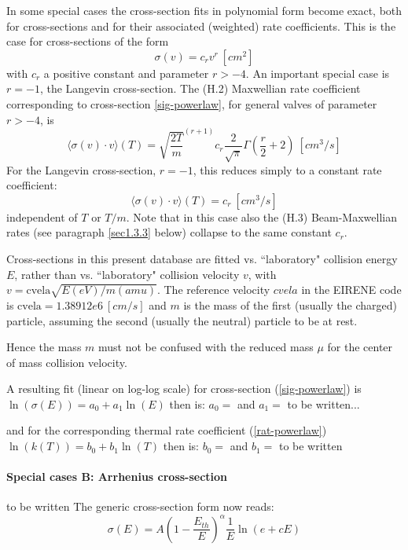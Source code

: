 \documentclass[12pt,dvipdfmx]{article}
\begin{document}
In some special cases the cross-section fits in polynomial form become exact, both for cross-sections and
for their associated (weighted) rate coefficients.
This is the case for cross-sections of the form
\begin{equation}\label{sig-powerlaw}
\sigma(v) = c_r v^r  \ [cm^2]
\end{equation}
with $c_r$ a positive constant and parameter $r>-4$. An important special case is $r=-1$, the Langevin cross-section.
The (H.2) Maxwellian rate coefficient corresponding to cross-section \ref{sig-powerlaw}, for general valves of parameter $r>-4$, is
\begin{equation}\label{rat-powerlaw}
\langle\sigma(v) \cdot v  \rangle (T) = \sqrt{\frac {2T}{m}}^{(r+1)} c_r \frac{2}{\sqrt{\pi}}
\Gamma(\frac{r}{2}+2) \ [cm^3/s]
\end{equation}
For the Langevin cross-section, $r=-1$, this reduces simply to a constant rate coefficient:
\begin{equation}
\langle\sigma(v) \cdot v  \rangle (T) =  c_r  \ [cm^3/s]
\end{equation}
independent of $T$ or $T/m$.
Note that in this case also the (H.3) Beam-Maxwellian rates
(see paragraph \ref{sec1.3.3} below) collapse to the same constant $c_r$.

Cross-sections in this present database are fitted vs. ``laboratory" collision energy $E$, rather than vs.
``laboratory" collision velocity $v$, with $v=\mbox{cvela} \sqrt{E(eV)/m(amu)}$.
The reference velocity $cvela$
in the EIRENE code is $\mbox{cvela} = 1.38912 e6 \ [cm/s]$ and $m$ is the mass of the first (usually the charged) particle, assuming the second (usually the neutral) particle to be at rest.

Hence the mass $m$ must not be confused with the reduced mass $\mu$ for the center
of mass collision velocity.

A resulting fit (linear on log-log scale) for cross-section (\ref{sig-powerlaw}) is
$\ln(\sigma(E)) = a_0 + a_1 \ln(E) $ then is: $a_0 =  $ and $a_1 = $   to be written...

and for the corresponding thermal rate coefficient (\ref{rat-powerlaw})
$\ln(k(T))= b_0 + b_1 \ln(T)$ then is: $b_0 =  $ and $b_1 = $  to be written

\paragraph*{\textbf{Special cases B: Arrhenius cross-section}}
to be written
The generic cross-section form now reads: %
\begin{equation}
 \sigma(E) = A \left( 1-\frac{E_{th}}{E}\right)^\alpha \frac1E \ln(e+cE)
\end{equation}
\end{document}
